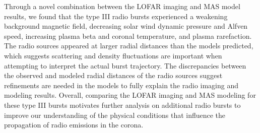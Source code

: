 Through a novel combination between the LOFAR imaging and MAS model results, we found that the type III radio bursts experienced a weakening background magnetic field, decreasing solar wind dynamic pressure and Alfven speed, increasing plasma beta and coronal temperature, and plasma rarefaction.
The radio sources appeared at larger radial distances than the models predicted, which suggests scattering and density fluctuations are important when attempting to interpret the actual burst trajectory.
The discrepancies between the observed and modeled radial distances of the radio sources suggest refinements are needed in the models to fully explain the radio imaging and modeling results. Overall, comparing the LOFAR imaging and MAS modeling for these type III bursts motivates further analysis on additional radio bursts to improve our understanding of the physical conditions that influence the propagation of radio emissions in the corona.
